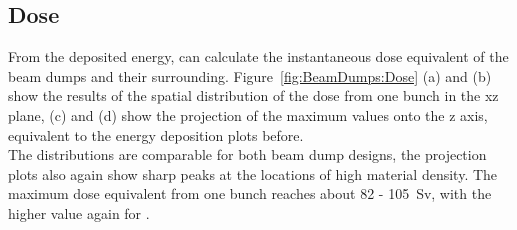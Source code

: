 \subsection{Dose}
\label{BeamDumps:sim_surrounding:Dose} 
From the deposited energy, \fluka can calculate the instantaneous dose equivalent of the beam dumps and their surrounding.
Figure~\ref{fig:BeamDumps:Dose} (a) and (b) show the \fluka results of the spatial distribution of the dose from one bunch in the xz plane, (c) and (d) show the projection of the maximum values onto the z axis, equivalent to the energy deposition plots before.
\\The distributions are comparable for both beam dump designs, the projection plots also again show sharp peaks at the locations of high material density.
The maximum dose equivalent from one bunch reaches about 82 - \SI{105}{\sievert}, with the higher value again for \designtwo.
